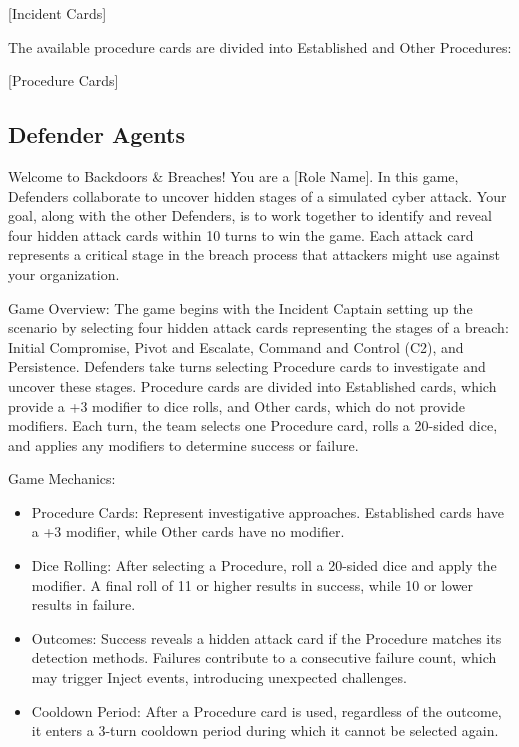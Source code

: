 \documentclass[letterpaper]{article} %
\begin{document}
[Incident Cards]

The available procedure cards are divided into Established and Other Procedures:

[Procedure Cards]

\subsection{Defender Agents}

Welcome to Backdoors \& Breaches! You are a [Role Name]. In this game, Defenders collaborate to uncover hidden stages of a simulated cyber attack. Your goal, along with the other Defenders, is to work together to identify and reveal four hidden attack cards within 10 turns to win the game. Each attack card represents a critical stage in the breach process that attackers might use against your organization.

Game Overview: The game begins with the Incident Captain setting up the scenario by selecting four hidden attack cards representing the stages of a breach: Initial Compromise, Pivot and Escalate, Command and Control (C2), and Persistence. Defenders take turns selecting Procedure cards to investigate and uncover these stages. Procedure cards are divided into Established cards, which provide a +3 modifier to dice rolls, and Other cards, which do not provide modifiers. Each turn, the team selects one Procedure card, rolls a 20-sided dice, and applies any modifiers to determine success or failure.

Game Mechanics:
\begin{itemize}
    \item Procedure Cards: Represent investigative approaches. Established cards have a +3 modifier, while Other cards have no modifier.
    \item Dice Rolling: After selecting a Procedure, roll a 20-sided dice and apply the modifier. A final roll of 11 or higher results in success, while 10 or lower results in failure.
    \item Outcomes: Success reveals a hidden attack card if the Procedure matches its detection methods. Failures contribute to a consecutive failure count, which may trigger Inject events, introducing unexpected challenges.
    \item Cooldown Period: After a Procedure card is used, regardless of the outcome, it enters a 3-turn cooldown period during which it cannot be selected again.
\end{itemize}
\end{document}
